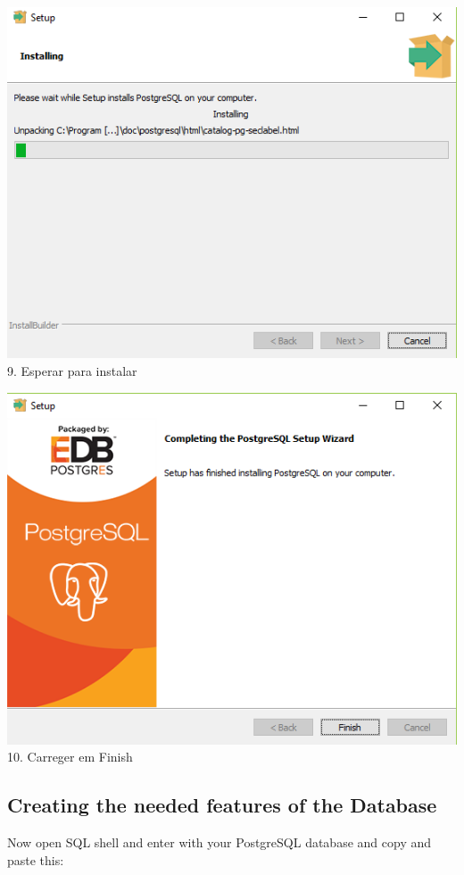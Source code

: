 \documentclass[a4paper, 11pt]{article}
\begin{document}
\begin{minipage}{0.45\textwidth}
  \includegraphics[width=\textwidth]{Screenshot-830.png}
  9. Esperar para instalar
\end{minipage}\hfill
\begin{minipage}{0.45\textwidth}
  \includegraphics[width=\textwidth]{Screenshot-937.png}
  10. Carreger em Finish
\end{minipage}

\vspace{1em}

\subsection{Creating the needed features of the Database}
Now open SQL shell and enter with your PostgreSQL database and copy and paste this:
\end{document}
